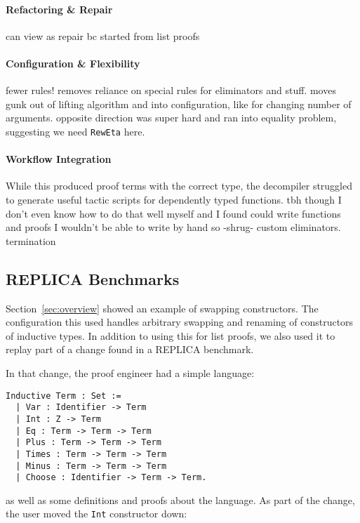 \paragraph{Refactoring \& Repair}
can view as repair bc started from list proofs

\paragraph{Configuration \& Flexibility}
fewer rules!
removes reliance on special rules for eliminators and stuff.
moves gunk out of lifting algorithm and into configuration, like for changing number of arguments.
opposite direction was super hard and ran into equality problem, suggesting 
we need \lstinline{RewEta} here.

\paragraph{Workflow Integration}
While this produced proof terms with the correct type, the decompiler struggled
to generate useful tactic scripts for dependently typed functions.
tbh though I don't even know how to do that well myself and I found \toolname could write
functions and proofs I wouldn't be able to write by hand so -shrug-
custom eliminators.
termination

\subsection{REPLICA Benchmarks}
\label{sec:replica}

Section~\ref{sec:overview} showed an example of swapping constructors.
The configuration this used handles arbitrary swapping and renaming of constructors of inductive types.
In addition to using this for list proofs, we also used it to replay part of a change found in
a REPLICA benchmark.

In that change, the proof engineer had a simple language:

\begin{lstlisting}
Inductive Term : Set :=
  | Var : Identifier -> Term
  | Int : Z -> Term
  | Eq : Term -> Term -> Term
  | Plus : Term -> Term -> Term
  | Times : Term -> Term -> Term
  | Minus : Term -> Term -> Term
  | Choose : Identifier -> Term -> Term.
\end{lstlisting}
as well as some definitions and proofs about the language.
As part of the change, the user moved the \lstinline{Int} constructor down:

